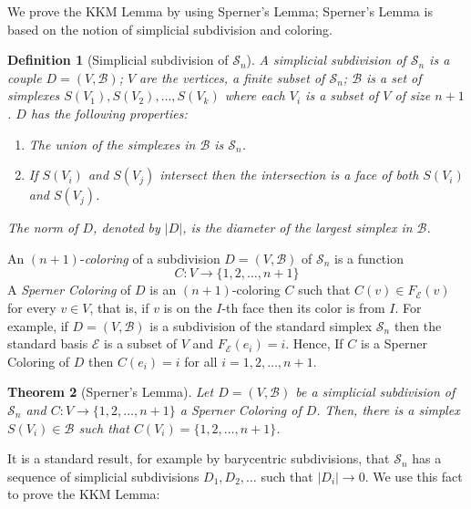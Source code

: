 \documentclass[12pt]{article}
\newtheorem{theorem}{Theorem}
\newtheorem{definition}[theorem]{Definition}
\begin{document}
We prove the KKM Lemma by using Sperner's Lemma; Sperner's Lemma
is based on the notion of simplicial subdivision and coloring.

\begin{definition}[Simplicial subdivision of $\mathcal{S}_n$]
A \emph{simplicial subdivision} of $\mathcal{S}_n$ is a couple
$D=(V,\mathcal{B})$; $V$ are the vertices, a finite subset of
$\mathcal{S}_n$; $\mathcal{B}$ is a set of simplexes $S(V_1),
S(V_2), \ldots, S(V_k)$ where each $V_i$ is a subset of $V$ of
size $n+1$. $D$ has the following properties:
\begin{enumerate}
    \item The union of the simplexes in $\mathcal{B}$ is
    $\mathcal{S}_n$.
    \item If $S(V_i)$ and $S(V_j)$ intersect then the
    intersection is a face of both $S(V_i)$ and $S(V_j)$.
\end{enumerate}
The \emph{norm} of $D$, denoted by $|D|$, is the diameter of the
largest simplex in $\mathcal{B}$.
\end{definition}

An $(n+1)$-\emph{coloring} of a subdivision $D=(V,\mathcal{B})$ of
$\mathcal{S}_n$ is a function
\[
C:V\to\{1,2,\ldots,n+1\}
\]
A \emph{Sperner Coloring} of $D$ is an $(n+1)$-coloring $C$ such
that $C(v)\in F_\mathcal{E}(v)$ for every $v\in V$, that is, if
$v$ is on the $I$-th face then its color is from $I$. For example,
if $D=(V,\mathcal{B})$ is a subdivision of the standard simplex
$\mathcal{S}_n$ then the standard basis $\mathcal{E}$ is a subset
of $V$ and $F_\mathcal{E}(e_i)=i$. Hence, If $C$ is a Sperner
Coloring of $D$ then $C(e_i)=i$ for all $i=1,2,\ldots,n+1$.

\begin{theorem}[Sperner's Lemma]
Let $D=(V,\mathcal{B})$ be a simplicial subdivision of
$\mathcal{S}_n$ and $C:V\to\{1,2,\ldots,n+1\}$ a Sperner Coloring
of $D$. Then, there is a simplex $S(V_i)\in\mathcal{B}$ such that
$C(V_i)=\{1,2,\ldots,n+1\}$.
\end{theorem}

It is a standard result, for example by barycentric subdivisions,
that $\mathcal{S}_n$ has a sequence of simplicial subdivisions
$D_1,D_2,\ldots$ such that $|D_i|\to0$. We use this fact to prove
the KKM Lemma:
\end{document}
